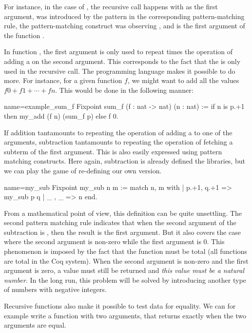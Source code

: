 For instance, in the case of , the recursive call happens
with  as the first argument,  was introduced by the pattern 
in the corresponding pattern-matching rule, the pattern-matching
construct was observing , and  is the first argument of the
function .

In function , the first argument  is only used to
repeat  times the operation of adding a  on the second
argument.  This corresponds to the fact that the  is only used in
the recursive call.  The programming language makes it possible to do
more.  For instance, for a given function \(f\), we might want to add all
the values \(f 0 + f 1 + \cdots + f n\).  This would be done in the
following manner:

\begin{coq}{name=example_sum_f}{}
Fixpoint sum_f (f : nat -> nat) (n : nat) :=
  if n is p.+1 then my_add (f n) (sum_f p) else f 0.
\end{coq}

If addition tantamounts to repeating the operation of adding a 
to one of the arguments, subtraction tantamounts to repeating the
operation of fetching a subterm of the first argument.  This is also
easily expressed using pattern matching constructs.  Here again,
subtraction is already defined the libraries, but we can play the game
of re-defining our own version.

\begin{coq}{name=my_sub}{}
Fixpoint my_sub n m :=
  match n, m with
  | p.+1, q.+1 => my_sub p q
  | _ , _ => n
  end.
\end{coq}
From a mathematical point of view, this definition can be quite
unsettling.  The second pattern matching rule indicates that when
the second argument of the subtraction is , then the result is
the first argument.  But it also covers the case where the second
argument is non-zero while the first argument is 0.  This phenomenon
is imposed by the fact that the function must be total (all functions
are total in the Coq system).  When the second argument is non-zero
and the first argument is zero, a value must still be returned and
{\em this value must be a natural number}.  In the long run, this
problem will be solved by introducing another type of numbers with
negative integers.

Recursive functions also make it possible to test data for
equality. We can for example write a function with two arguments, that
returns  exactly when the two arguments are equal.

